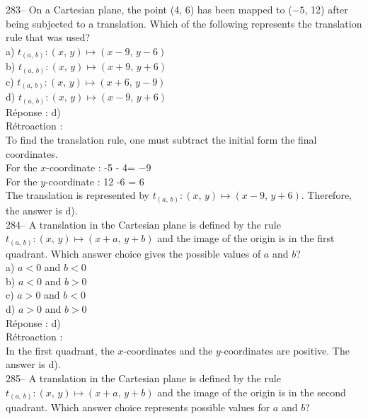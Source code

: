 \documentclass[letterpaper, 12pt]{article}
\begin{document}
283-- On a Cartesian plane, the point (4, 6) has been mapped to
($-5$, 12) after being subjected to a translation. Which of the
following represents the translation rule that was used?\\

a) $t_{\left( a,\,b\right) } :\left( x,\,y\right) \longmapsto
\left(x-9,\,y-6\right) $\\
b) $t_{\left( a,\,b\right) } :\left(x,\,y\right)\longmapsto
\left(x+9,\,y+6\right)$\\
c) $t_{\left( a,\,b\right) } :\left(x,\,y\right )\longmapsto
\left(x+6,\,y-9\right)$\\
d) $t_{\left( a,\,b\right) } :\left(x,\,y\right)\longmapsto
\left(x-9,\,y+6\right)$\\

R\'eponse : d)\\

R\'etroaction :\\
To find the translation rule, one must subtract the initial form the
final coordinates.\\
For the $x$-coordinate :  -5 - 4= $-9$\\
For the $y$-coordinate :  12 -6 = 6\\
The translation is represented by $t_{\left( a,\,b\right) }
:\left(x,\,y\right)\longmapsto \left(x-9,\,y+6\right)$.
Therefore, the answer is d).\\

284-- A translation in the Cartesian plane is defined by the rule
$t_{\left( a,\,b\right) } :\left(x,\,y\right)\longmapsto
\left(x+a,\,y+b\right) $ and the image of the origin is in the first
quadrant. Which answer choice gives the possible values of $a$
and $b$?\\

a) $a<0$ and $b<0$\\
b) $a<0$ and $b>0$\\
c) $a>0$ and $b<0$\\
d) $a>0$ and $b>0$\\

R\'eponse : d)\\

R\'etroaction : \\
In the first quadrant, the $x$-coordinates and the $y$-coordinates
are positive. The answer is d).\\

285-- A translation in the Cartesian plane is defined by the rule
$t_{\left( a,\,b\right) } :\left(x,\,y\right)\longmapsto
\left(x+a,\,y+b\right) $ and the image of the origin is in the
second quadrant. Which answer choice represents possible values for $a$ and $b$?\\
\end{document}
